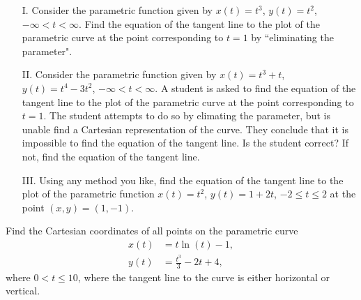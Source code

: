 \documentclass[handout]{ximera}
\begin{document}
\begin{problem}
\begin{itemize}
\item[I.] Consider the parametric function given by $x(t)=t^3$, $y(t)=t^2$, $-\infty <  t < \infty$. Find the equation of the tangent line to the plot of the parametric curve at the point corresponding to $t=1$ by ``eliminating the parameter". 

\item[II.] Consider the parametric function given by $x(t)=t^3+t$, $y(t)=t^4-3t^2$, $-\infty <  t < \infty$. A student is asked to find the equation of the tangent line to the plot of the parametric curve at the point corresponding to $t=1$. The student attempts to do so by elimating the parameter, but is unable find a Cartesian representation of the curve. They conclude that it is impossible to find the equation of the tangent line. Is the student correct? If not, find the equation of the tangent line.

\item[III.] Using any method you like, find the equation of the tangent line to the plot of the parametric function $x(t)=t^2$, $y(t)=1+2t$, $-2 \leq t \leq 2$ at the point $(x,y)=(1,-1)$. 
\end{itemize}
\end{problem}

\begin{problem}
Find the Cartesian coordinates of all points on the parametric curve
\begin{align*}
x(t) &= t \ln (t) - 1,\\
y(t) &= \frac{t^3}{3}-2t + 4,
\end{align*}
where $0< t \leq 10$, where the tangent line to the curve is either horizontal or vertical.
\end{problem}
\end{document}
